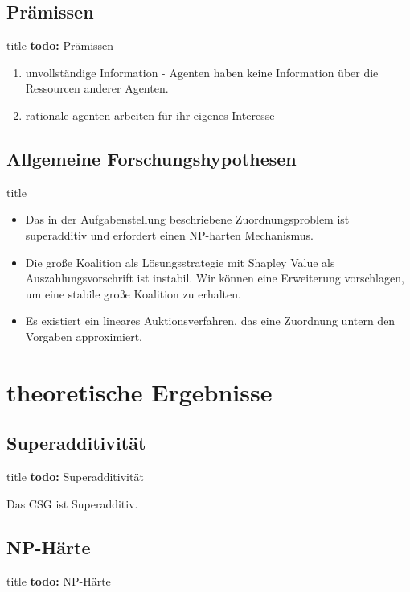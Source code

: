 \documentclass[c]{beamer}
\newcommand\todo[1]{\colorbox{blue!15}{\textbf{todo: }#1}\newline}
\theoremstyle{break}
\begin{document}
  \subsection*{Prämissen} 
  \begin{frame}{title} %
    \todo{Prämissen}
    \begin{enumerate}
      \item unvollständige Information - Agenten haben keine Information über die Ressourcen anderer Agenten.
      \item rationale agenten arbeiten für ihr eigenes Interesse
    \end{enumerate}
  \end{frame}
  
  
  \subsection*{Allgemeine Forschungshypothesen}
  \begin{frame}{title} %
    \begin{itemize}
    \item Das in der Aufgabenstellung beschriebene Zuordnungsproblem ist superadditiv  und erfordert einen NP-harten Mechanismus.
    \item Die große Koalition als Lösungsstrategie mit Shapley Value als  Auszahlungsvorschrift ist instabil. Wir können eine Erweiterung vorschlagen, um eine stabile große Koalition zu erhalten.
    \item Es existiert ein lineares Auktionsverfahren, das eine Zuordnung untern den Vorgaben approximiert.
    \end{itemize}
  \end{frame}


  \section*{theoretische Ergebnisse}
  \subsection*{Superadditivität}
  \begin{frame}{title} %
    \todo{Superadditivität}
    \begin{lemma}
      Das CSG ist Superadditiv.
    \end{lemma}
  \end{frame}
  
  
  \subsection*{NP-Härte}
  \begin{frame}{title} %
    \todo{NP-Härte}
    \begin{lemma}
    
    \end{lemma}
  \end{frame}
  
\end{document}
